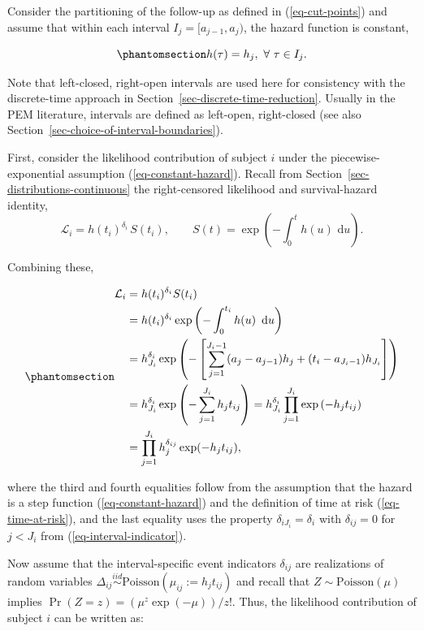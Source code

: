 \documentclass[
  letterpaper,
  krantz2]{style/krantz}
\begin{document}
Consider the partitioning of the follow-up as defined in
(\ref{eq-cut-points}) and assume that within each interval
\(I_j = [a_{j-1}, a_j)\), the hazard function is constant,

\begin{equation}\phantomsection\label{eq-constant-hazard}{
h(\tau) = h_j,\ \forall\ \tau \in I_j.
}\end{equation}

Note that left-closed, right-open intervals are used here for
consistency with the discrete-time approach in
Section~\ref{sec-discrete-time-reduction}. Usually in the PEM
literature, intervals are defined as left-open, right-closed (see also
Section~\ref{sec-choice-of-interval-boundaries}).

First, consider the likelihood contribution of subject \(i\) under the
piecewise-exponential assumption (\ref{eq-constant-hazard}). Recall from
Section~\ref{sec-distributions-continuous} the right-censored likelihood
and survival-hazard identity, \[
\mathcal{L}_i = h(t_i)^{\delta_i}\, S(t_i), \qquad S(t) = \exp\!\left(-\int_0^t h(u)\,\,\mathrm{d}u\right).
\]

Combining these,

\begin{equation}\phantomsection\label{eq-pem-likelihood-general}{
\begin{aligned}
\mathcal{L}_{i}
& = h(t_i)^{\delta_{i}}S(t_i)\\
& = h(t_i)^{\delta_{i}}\exp\left(-\int_{0}^{t_i} h(u) \ \,\mathrm{d}u\right)\\
& = h_{J_i}^{\delta_{i}}\exp\left(-\left[\sum_{j=1}^{J_i-1} (a_j - a_{j-1})h_j + (t_i - a_{J_i-1})h_{J_i}\right]\right)\\
& = h_{J_i}^{\delta_{i}}\exp\left(-\sum_{j=1}^{J_i} h_j t_{ij}\right) = h_{J_i}^{\delta_{i}}\prod_{j=1}^{J_i}\exp\left(- h_j t_{ij}\right)\\
& = \prod_{j=1}^{J_i} h_j^{\delta_{ij}} \exp(-h_j t_{ij}),
\end{aligned}
}\end{equation}

where the third and fourth equalities follow from the assumption that
the hazard is a step function (\ref{eq-constant-hazard}) and the
definition of time at risk (\ref{eq-time-at-risk}), and the last
equality uses the property \(\delta_{iJ_i} = \delta_i\) with
\(\delta_{ij}=0\) for \(j<J_i\) from (\ref{eq-interval-indicator}).

Now assume that the interval-specific event indicators \(\delta_{ij}\)
are realizations of random variables
\(\Delta_{ij} \stackrel{iid}{\sim} \text{Poisson}(\mu_{ij} := h_j t_{ij})\)
and recall that \(Z\sim \text{Poisson}(\mu)\) implies
\(\Pr(Z = z) = (\mu^z \exp(-\mu))/z!\). Thus, the likelihood
contribution of subject \(i\) can be written as:
\end{document}
